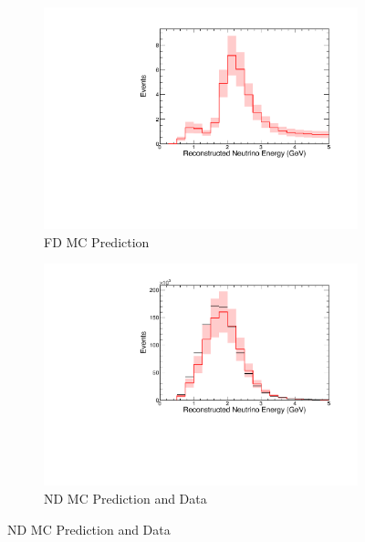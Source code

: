 \begin{figure}
\begin{center}
\begin{subfigure}[c]{0.49\textwidth}
\includegraphics[width=\textwidth]{figures/systs/prediction/fd_mc_prediction_allBeam.pdf}
\caption*{FD MC Prediction}
\end{subfigure}
\begin{subfigure}[c]{0.49\textwidth}
\includegraphics[width=\textwidth]{figures/systs/prediction/nd_mc_prediction_allBeam.pdf}
\caption*{ND MC Prediction and Data}
\end{subfigure}

\vspace{20pt}


\end{center}
\end{figure}
